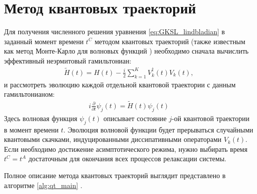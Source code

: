 \section{Метод квантовых траекторий}\label{sec:ch1/qj}
Для получения численного решения уравнения \cref{eq:GKSL_lindbladian} в заданный момент времени \(t^C\) методом квантовых траекторий (также известным как метод Монте-Карло для волновых функций \cite{Molmer1993}) необходимо сначала вычислить эффективный неэрмитовый гамильтониан:
\begin{equation}
\label{eq:H_nonhermit}
\begin{gathered}
\tilde{H}(t) = H(t) - \frac{i}{2} \sum_{k=1}^{K} V_k^\dagger(t) V_k(t),
\end{gathered}
\end{equation}
и рассмотреть эволюцию каждой отдельной квантовой траектории с данным гамильтонианом:
\begin{equation}
\label{eq:schrodinger}
\begin{gathered}
i \frac{\partial}{\partial t} \psi_j(t) = \tilde{H}(t) \psi_j(t)
\end{gathered}
\end{equation}
Здесь волновая функция \(\psi_j(t)\) описывает состояние \(j\)-ой квантовой траектории в момент времени \(t\). Эволюция волновой функции будет прерываться случайными квантовыми скачками, индуцированными диссипативными операторами \(V_k(t)\). Если необходимо достижение асимптотического режима, нужно выбирать время \(t^C = t^A\) достаточным для окончания всех процессов релаксации системы.

Полное описание метода квантовых траекторий выглядит представлено в алгоритме \ref{alg:qt_main} \cite{Volokitin2017}.

